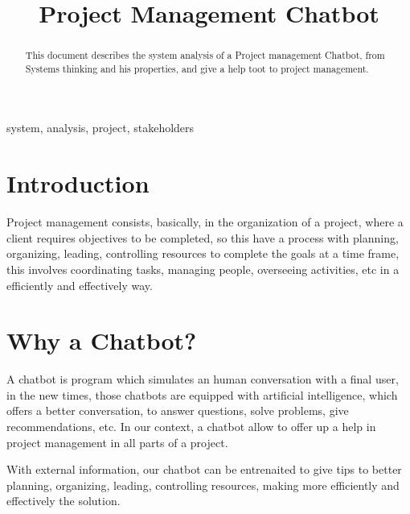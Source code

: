 \documentclass[conference]{IEEEtran}
\begin{document}
	
	\title{Project Management Chatbot}
	
	\author{
		\and
		
	}
	
	\maketitle
	
	\begin{abstract}
		This document describes the system analysis of a Project management Chatbot, from Systems thinking and his properties, and give a help toot to project management.
	\end{abstract}
	
	\begin{IEEEkeywords}
		system, analysis, project, stakeholders
	\end{IEEEkeywords}
	
	\section{Introduction}
	Project management consists, basically, in the organization of a project, where a client requires objectives to be completed, so this have a process with planning, organizing, leading, controlling resources to complete the goals at a time frame, this involves coordinating tasks, managing people, overseeing activities, etc in a efficiently and effectively way.
	
	\section{Why a Chatbot?}
	
	A chatbot is program which simulates an human conversation with a final user, in the new times, those chatbots are equipped with artificial intelligence, which offers a better conversation, to answer questions, solve problems, give recommendations, etc. In our context, a chatbot allow to offer up a help in project management in all parts of a project.
	
	With external information, our chatbot can be entrenaited to give tips to better planning, organizing, leading, controlling resources, making more efficiently and effectively the solution.
	
\end{document}
